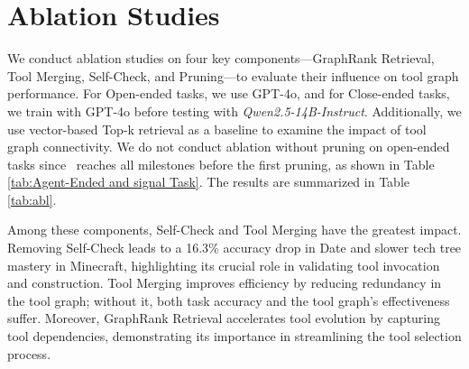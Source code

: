 \section{Ablation Studies}
\label{sec:abl}

We conduct ablation studies on four key components—GraphRank Retrieval, Tool Merging, Self-Check, and Pruning—to evaluate their influence on tool graph performance. For Open-ended tasks, we use GPT-4o, and for Close-ended tasks, we train with GPT-4o before testing with \textit{Qwen2.5-14B-Instruct}. Additionally, we use vector-based Top-k retrieval as a baseline to examine the impact of tool graph connectivity. We do not conduct ablation without pruning on open-ended tasks  since \ours\ reaches all milestones before the first pruning, as shown in Table \ref{tab:Agent-Ended and signal Task}. The results are summarized in Table \ref{tab:abl}. 

Among these components, Self-Check and Tool Merging have the greatest impact. Removing Self-Check leads to a 16.3\% accuracy drop in Date and slower tech tree mastery in Minecraft, highlighting its crucial role in validating tool invocation and construction. Tool Merging improves efficiency by reducing redundancy in the tool graph; without it, both task accuracy and the tool graph’s effectiveness suffer. Moreover, GraphRank Retrieval accelerates tool evolution by capturing tool dependencies, demonstrating its importance in streamlining the tool selection process.

